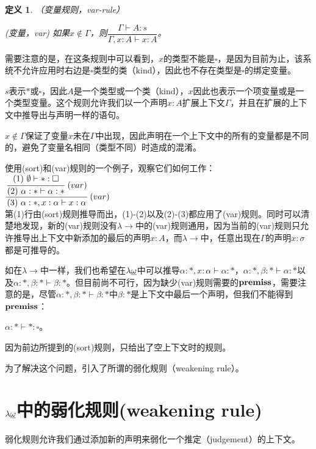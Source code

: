 \documentclass[UTF8]{article}
\newtheorem{thm}{定义}[section]
\begin{document}
		\begin{thm}（变量规则，var-rule）
			
			(变量，var) 如果$x\not\in\Gamma$，则$\dfrac{\Gamma\vdash A:s}{\Gamma,x:A\vdash x:A}$。
		\end{thm}

		需要注意的是，在这条规则中可以看到，$x$的类型不能是$\square$，是因为目前为止，该系统不允许应用时右边是$\square$类型的类（kind），因此也不存在类型是$\square$的绑定变量。

		$s$表示$*$或$\square$，因此$A$是一个类型或一个类（kind），$x$因此也表示一个项变量或是一个类型变量。这个规则允许我们以一个声明$x:A$扩展上下文$\Gamma$，并且在扩展的上下文中推导出与声明一样的语句。

		$x\not\in\Gamma$保证了变量$x$未在$\Gamma$中出现，因此声明在一个上下文中的所有的变量都是不同的，避免了变量名相同（类型不同）时造成的混淆。

		使用(sort)和(var)规则的一个例子，观察它们如何工作：\\

		$\cfrac{\cfrac{(1)\ \emptyset\vdash*:\square}{(2)\ \alpha:*\vdash\alpha:*}\ (var)}{(3)\ \alpha:*,x:\alpha\vdash x:\alpha}\ (var)$\\
		
		第(1)行由(sort)规则推导而出，(1)-(2)以及(2)-(3)都应用了(var)规则。同时可以清楚地发现，新的(var)规则没有$\lambda{\rightarrow}$中的(var)规则通用，因为当前的(var)规则只允许推导出上下文中新添加的最后的声明$x:A$，而$\lambda{\rightarrow}$中，任意出现在$\Gamma$的声明$x:\sigma$都是可推导的。
		
		如在$\lambda\rightarrow$中一样，我们也希望在$\lambda{\uline{\omega}}$中可以推导$\alpha:*,x:\alpha\vdash\alpha:*$，$\alpha:*,\beta:*\vdash\alpha:*$以及$\alpha:*,\beta:*\vdash\beta:*$。但目前尚不可行，因为缺少(var)规则需要的$\bf premiss$，需要注意的是，尽管$\alpha:*,\beta:*\vdash\beta:*$中$\beta:*$是上下文中最后一个声明，但我们不能得到$\bf premiss$：
		
		$\alpha:*\vdash*:\square$。
		
		因为前边所提到的(sort)规则，只给出了空上下文时的规则。
		
		为了解决这个问题，引入了所谓的弱化规则（weakening rule）。
		
	\section{$\lambda{\uline{\omega}}$中的弱化规则(weakening rule)}
		\noindent
		弱化规则允许我们通过添加新的声明来弱化一个推定（judgement）的上下文。
		
\end{document}
